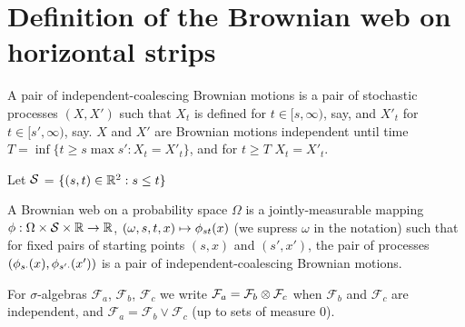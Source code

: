 {
\section{Definition of the Brownian web on horizontal strips}

\begin{definition}
  \label{def:independent-coalescing-bm}
  A pair of independent-coalescing Brownian motions is a pair of
  stochastic processes $(X, X')$ such that $X_t$ is defined for $t \in
  [s, \infty)$, say, and $X'_t$ for $t \in [s', \infty)$, say.  $X$
      and $X'$ are Brownian motions independent until time $T = \inf
      \{ t \ge s \max s' : X_t = X'_t\}$, and for $t \ge T$ $X_t =
      X'_t$.
\end{definition}

\begin{notation}
  Let $\mathcal{S}$ = $\{(s, t) \in \mathbb{R}^2 : s \le t\}$
\end{notation}

\begin{definition}
  A Brownian web on a probability space $\Omega$ is a
  jointly-measurable mapping $\phi : \Omega \times \mathcal{S} \times
  \mathbb{R} \to \mathbb{R}$, $(\omega, s, t, x) \mapsto \phi_{{s}{t}}(x)$ (we supress
  $\omega$ in the notation) such that for fixed pairs of starting
  points $(s, x)$ and $(s', x')$, the pair of processes $(\phi_{{s}{\cdot}}(x), \phi_{{s'}{\cdot}}(x'))$ is a pair of independent-coalescing
  Brownian motions.
\end{definition}

\begin{note}
  \newcommand{\F}{\mathcal{F}}

  For $\sigma$-algebras $\F_a$, $\F_b$, $\F_c$ we write $\F_a = \F_b
  \tensor \F_c$ when $\F_b$ and $\F_c$ are independent, and $\F_a =
  \F_b \vee \F_c$ (up to sets of measure $0$).
\end{note}

}
